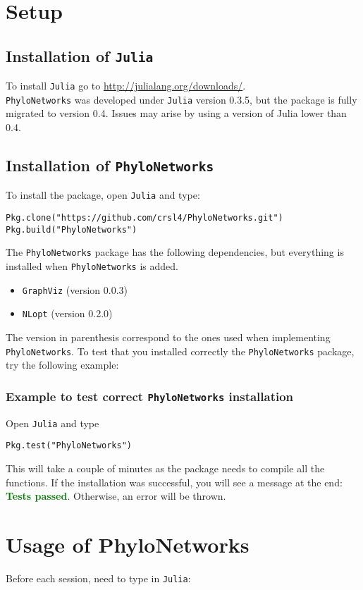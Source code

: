 \documentclass[12pt]{article}
\begin{document}
\section{Setup}
\subsection{Installation of \texttt{Julia}}
To install \texttt{Julia} go to \url{http://julialang.org/downloads/}.\\
\texttt{PhyloNetworks} was developed under \texttt{Julia}
version 0.3.5, but the package is fully migrated to version 0.4.
Issues may arise by using a version of Julia lower than 0.4.

\subsection{Installation of \texttt{PhyloNetworks}}
To install the package,
open
\texttt{Julia} and type:
\begin{lstlisting}
Pkg.clone("https://github.com/crsl4/PhyloNetworks.git")
Pkg.build("PhyloNetworks")
\end{lstlisting}

The \texttt{PhyloNetworks} package has the following dependencies, but everything is installed when
\texttt{PhyloNetworks} is added.
\begin{itemize}
\item \texttt{GraphViz} (version 0.0.3)
\item \texttt{NLopt} (version 0.2.0)
\end{itemize}
The version in parenthesis correspond to the ones used when
implementing \texttt{PhyloNetworks}.
To test that you installed correctly the \texttt{PhyloNetworks} package, try the following example:

\subsubsection{Example to test correct \texttt{PhyloNetworks} installation}
Open \texttt{Julia} and type
\begin{lstlisting}
Pkg.test("PhyloNetworks")
\end{lstlisting}
This will take a couple of
minutes as the package needs to compile all the functions. If the
installation was successful, you will see a message at the end:
\textcolor{green}{\textbf{Tests passed}}. Otherwise, an error will be thrown.

\section{Usage of PhyloNetworks}
Before each session, need to type in \texttt{Julia}:
\end{document}

